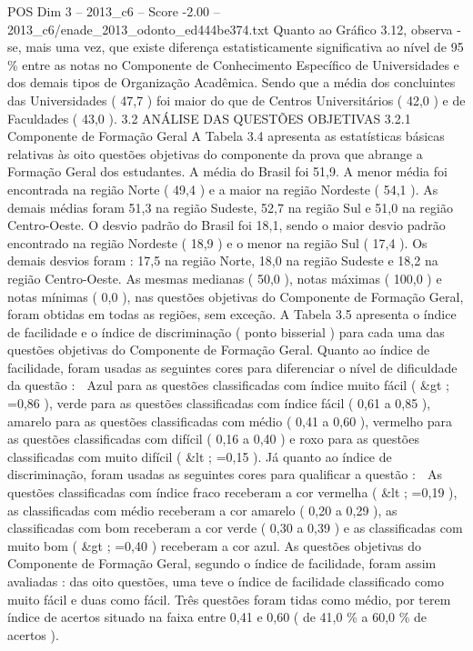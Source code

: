 \begin{textsample}{POS Dim 3 – 2013\_c6 – Score -2.00 – 2013\_c6/enade\_2013\_odonto\_ed444be374.txt}
Quanto ao Gráfico 3.12, observa -se, mais uma vez, que existe diferença estatisticamente significativa ao nível de 95 \% entre as notas no Componente de Conhecimento Específico de Universidades e dos demais tipos de Organização Acadêmica.
Sendo que a média dos concluintes das Universidades ( 47,7 ) foi maior do que de Centros Universitários ( 42,0 ) e de Faculdades ( 43,0 ). 3.2 ANÁLISE DAS QUESTÕES OBJETIVAS 3.2.1 Componente de Formação Geral A Tabela 3.4 apresenta as estatísticas básicas relativas às oito questões objetivas do componente da prova que abrange a Formação Geral dos estudantes.
A média do Brasil foi 51,9.
A menor média foi encontrada na região Norte ( 49,4 ) e a maior na região Nordeste ( 54,1 ).
As demais médias foram 51,3 na região Sudeste, 52,7 na região Sul e 51,0 na região Centro-Oeste.
O desvio padrão do Brasil foi 18,1, sendo o maior desvio padrão encontrado na região Nordeste ( 18,9 ) e o menor na região Sul ( 17,4 ).
Os demais desvios foram : 17,5 na região Norte, 18,0 na região Sudeste e 18,2 na região Centro-Oeste.
As mesmas medianas ( 50,0 ), notas máximas ( 100,0 ) e notas mínimas ( 0,0 ), nas questões objetivas do Componente de Formação Geral, foram obtidas em todas as regiões, sem exceção.
A Tabela 3.5 apresenta o índice de facilidade e o índice de discriminação ( ponto bisserial ) para cada uma das questões objetivas do Componente de Formação Geral.
Quanto ao índice de facilidade, foram usadas as seguintes cores para diferenciar o nível de dificuldade da questão :  Azul para as questões classificadas com índice muito fácil ( \&gt ; =0,86 ), verde para as questões classificadas com índice fácil ( 0,61 a 0,85 ), amarelo para as questões classificadas com médio ( 0,41 a 0,60 ), vermelho para as questões classificadas com difícil ( 0,16 a 0,40 ) e roxo para as questões classificadas com muito difícil ( \&lt ; =0,15 ).
Já quanto ao índice de discriminação, foram usadas as seguintes cores para qualificar a questão :  As questões classificadas com índice fraco receberam a cor vermelha ( \&lt ; =0,19 ), as classificadas com médio receberam a cor amarelo ( 0,20 a 0,29 ), as classificadas com bom receberam a cor verde ( 0,30 a 0,39 ) e as classificadas com muito bom ( \&gt ; =0,40 ) receberam a cor azul.
As questões objetivas do Componente de Formação Geral, segundo o índice de facilidade, foram assim avaliadas : das oito questões, uma teve o índice de facilidade classificado como muito fácil e duas como fácil.
Três questões foram tidas como médio, por terem índice de acertos situado na faixa entre 0,41 e 0,60 ( de 41,0 \% a 60,0 \% de acertos ).

\end{textsample}
